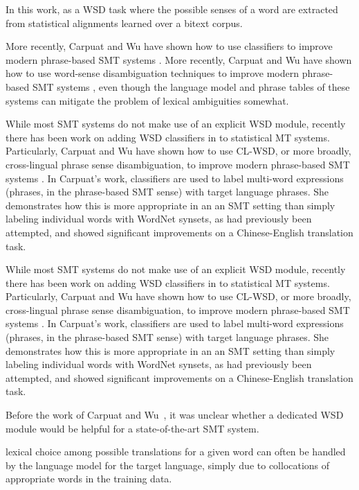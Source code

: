 In this work,
as a WSD task where the possible senses of a word are extracted from
statistical alignments learned over a bitext corpus.


More recently, Carpuat and Wu have
shown how to use classifiers to improve modern phrase-based SMT systems
\cite{carpuatpsd}.
More recently, Carpuat and Wu have
shown how to use word-sense disambiguation techniques to improve modern
phrase-based SMT systems \cite{carpuatpsd}, even though the language model and
phrase tables of these systems can mitigate the problem of lexical ambiguities
somewhat.

While most SMT systems do not make use of an explicit WSD module, recently
there has been work on adding WSD classifiers in to statistical MT systems.
Particularly, Carpuat and Wu have shown how to use CL-WSD, or more broadly,
cross-lingual phrase sense disambiguation, to improve modern phrase-based SMT
systems
\cite{carpuatpsd,carpuat-wu:2007:EMNLP-CoNLL2007,carpuat2008evaluation}. In
Carpuat's work, classifiers are used to label multi-word expressions (phrases,
in the phrase-based SMT sense) with target language phrases. She demonstrates
how this is more appropriate in an an SMT setting than simply labeling
individual words with WordNet synsets, as had previously been attempted, and
showed significant improvements on a Chinese-English translation task.

While most SMT systems do not make use of an explicit WSD module, recently
there has been work on adding WSD classifiers in to statistical MT systems.
Particularly, Carpuat and Wu have shown how to use CL-WSD, or more broadly,
cross-lingual phrase sense disambiguation, to improve modern phrase-based SMT
systems
\cite{carpuatpsd,carpuat-wu:2007:EMNLP-CoNLL2007,carpuat2008evaluation}. In
Carpuat's work, classifiers are used to label multi-word expressions (phrases,
in the phrase-based SMT sense) with target language phrases. She demonstrates
how this is more appropriate in an an SMT setting than simply labeling
individual words with WordNet synsets, as had previously been attempted, and
showed significant improvements on a Chinese-English translation task.

Before the work of Carpuat and Wu~\cite{improvingsmtwsd}, it was
unclear whether a dedicated WSD module would be helpful for a state-of-the-art 
SMT system.

lexical choice among possible translations for a given word can
often be handled by the language model for the target language, simply due to
collocations of appropriate words in the training data.


